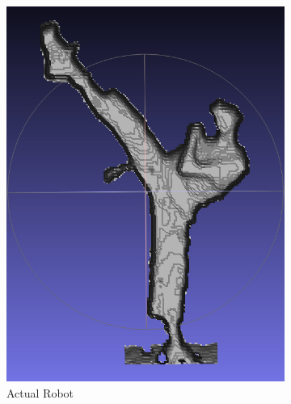 \documentclass[pdftex,10.5pt]{report}
\begin{document}
\begin{figure}
    \centering
    \begin{subfigure}[H]{0.4\textwidth}
        \includegraphics[width=\textwidth]{figures/filter}
        \caption{Actual Robot}
    \end{subfigure}
    \begin{subfigure}[H]{0.4\textwidth}

\end{subfigure}
\end{figure}
\end{document}
